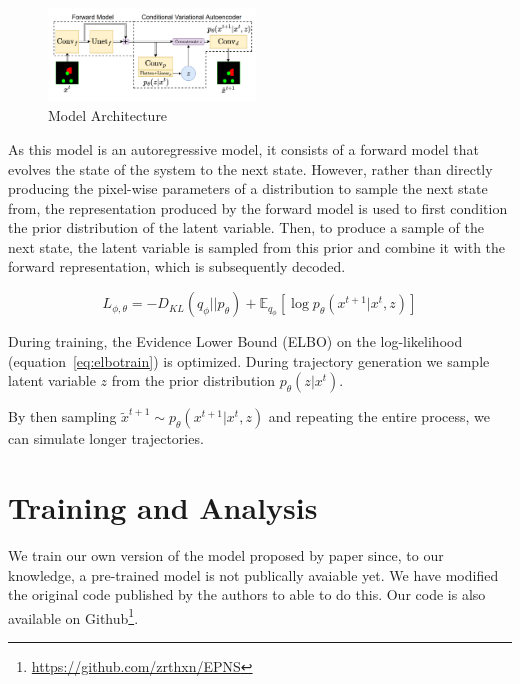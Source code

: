 \documentclass[a4paper,10pt,twocolumn]{article}
\begin{document}
            \begin{figure}[H]
                \centering
                \includegraphics[width=0.49\textwidth]{../images/architecture.png}
                \caption{Model Architecture}\label{fig:architecture}
            \end{figure}

            As this model is an autoregressive model, it consists of a forward model that evolves the state of
            the system to the next state. However, rather than directly producing the pixel-wise parameters of a
            distribution to sample the next state from, the representation produced by the forward model is used
            to first condition the prior distribution of the latent variable. Then, to produce a sample of the next
            state, the latent variable is sampled from this prior and combine it with the forward representation,
            which is subsequently decoded.

            \begin{equation}
                L_{\phi, \theta} = -D_{KL}(q_\phi || p_\theta)
                + \mathbb{E}_{q_\phi}[\log p_\theta(x^{t+1}|x^t, z)]
                \label{eq:elbotrain}
            \end{equation}
            
            During training, the Evidence Lower Bound (ELBO) on the log-likelihood (equation~\ref{eq:elbotrain})
            is optimized. During trajectory generation we sample latent variable $z$ from the prior 
            distribution $p_\theta(z | x^t)$.
            
            By then sampling $\tilde{x}^{t+1} \sim p_\theta(x^{t+1}|x^t, z)$ and
            repeating the entire process, we can simulate longer trajectories.


    \section{Training and Analysis}
        We train our own version of the model proposed by paper since, to our knowledge, 
        a pre-trained model is not publically avaiable yet. We have modified the original
        code published by the authors to able to do this. 
        Our code is also available on Github\footnote{\url{https://github.com/zrthxn/EPNS}}.
\end{document}
